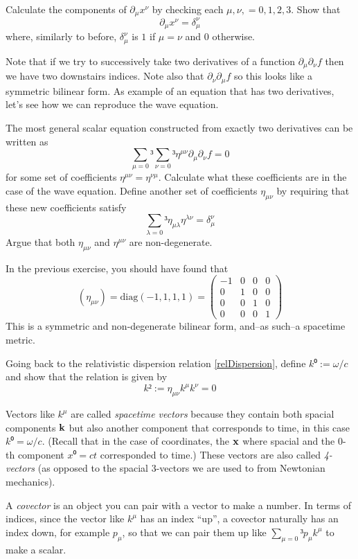 \begin{exercise}
Calculate the components of $∂_μ x^ν$ by checking each $μ, ν, =0,1, 2,3$. Show that 
$$
∂_μ x^ν = δ_μ^ν
$$
where, similarly to before, $δ_μ^ν$ is $1$ if $μ =ν$ and $0$ otherwise. 
\end{exercise}
Note that if we try to successively take two derivatives of a function $∂_μ ∂_ν f$ then we have two downstairs indices. Note also that $ ∂_ν ∂_μ f$ so this looks like a symmetric bilinear form. 
As example of an equation that has two derivatives, let's see how we can reproduce the wave equation. 
\begin{exercise}
The most general scalar equation constructed from exactly two derivatives can be written as 
$$
∑_{μ =0}³ ∑_{ν =0}³ η^{μν} ∂_μ ∂_ν f = 0
$$
for some set of coefficients $η^{μν}=η^{νμ}$. Calculate what these coefficients are in the case of the wave equation. Define another set of coefficients $η_{μν}$ by requiring that these new coefficients satisfy 
$$
∑_{λ =0}³ η_{μλ }η^{λν} = δ_μ^ν 
$$
Argue that both $η_{μν}$ and $η^{μν}$ are non-degenerate. 
\end{exercise}
In the previous exercise, you should have found that 
\begin{equation}\label{Minkowski}
(η_{μν}) = \mathrm{diag}(-1, 1,1,1) 
	= \left(\begin{array}{cccc}
		-1 &0&0&0\\
		0&1&0&0\\
		0&0&1&0\\
		0&0&0&1
	\end{array}
	\right)
\end{equation}
This is a symmetric and non-degenerate bilinear form, and--as such--a spacetime metric. 

\begin{exercise}
Going back to the relativistic dispersion relation \eqref{relDispersion}, define $k⁰ := ω/c$ and show that the relation is given by 
$$
k² := η_{μν} k^μ k^ν = 0
$$
\end{exercise}
Vectors like $k^μ$ are called {\em spacetime vectors} because they contain both spacial components $\bf k$ but also another component that corresponds to time, in this case $k⁰=ω/c$. (Recall that in the case of coordinates, the $\bf x$ where spacial and the 0-th component $x⁰ = ct$ corresponded to time.)
These vectors are also called {\em 4-vectors} (as opposed to the spacial 3-vectors we are used to from Newtonian mechanics). 

A {\em covector} is an object you can pair with a vector to make a number. In terms of indices, since the vector like $k^μ$ has an index “up”, a covector naturally has an index down, for example $p_μ$, so that we can pair them up like $∑_{μ=0}³ p_μ k^μ $ to make a scalar. 


